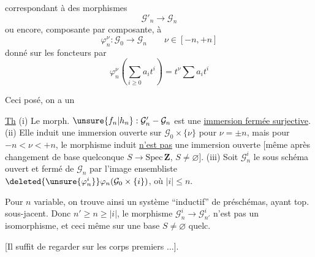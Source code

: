 correspondant à des morphismes
\[
\mathcal G'_n\longrightarrow\mathcal G_n
\]
ou encore, composante par composante, à
\[
\varphi_n^\nu:\mathcal G_0\longrightarrow\mathcal G_n\qquad \nu\in[-n,+n]
\]
donné  sur les foncteurs par
\[
\varphi_n^\nu\left(\sum_{i\geq0}a_it^i\right)=t^\nu\sum a_it^i
\]

Ceci posé, on a un

\uline{Th} (i) Le morph. $\unsure{f_n|h_n}:\mathcal G'_n-\mathcal G_n$ est une \uline{immersion fermée surjective}. (ii) Elle induit une immersion ouverte sur $\mathcal G_0\times\{\nu\}$ pour $\nu=\pm n$, mais pour $-n<\nu<+n$, le morphisme induit \uline{n'est pas} une immersion ouverte [même après changement de base quelconque $S\longrightarrow\mathrm{Spec}\,\mathbf Z$, $S\ne\varnothing$]. (iii) Soit $\mathcal G_n^i$ le sous schéma ouvert  et fermé de $\mathcal G_n$  par l'image ensembliste $\deleted{\unsure{\varphi_n^i}}\varphi_n(\mathcal G_0\times\{i\})$, où $|i|\leq n$.


Pour $n$ variable, on trouve ainsi un système ``inductif''  de préschémas, ayant   top. sous-jacent. Donc  $n'\geq n\geq|i|$, le morphisme $\mathcal G_n^i\longrightarrow\mathcal G_{n'}^i$ n'est pas un isomorphisme, et ceci même sur une base $S\ne\varnothing$ quelc.

[Il suffit de regarder sur les corps premiers $\ldots$].
